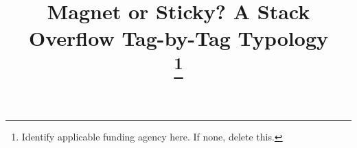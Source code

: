 \documentclass[conference]{IEEEtran}
\begin{document}
\title{Magnet or Sticky? A Stack Overflow Tag-by-Tag Typology\\
\thanks{Identify applicable funding agency here. If none, delete this.}
}


\maketitle
\end{document}
